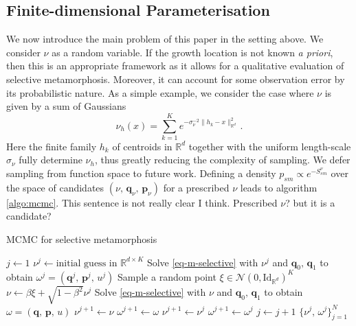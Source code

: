 \documentclass[runningheads]{llncs}
\newcommand{\Rd}{\mathbb{R}^{d}}
\newcommand{\RdK}{\mathbb{R}^{d\times K}}
\begin{document}
\subsection{Finite-dimensional Parameterisation}\label{subs:finite-dim-param}

We now introduce the main problem of this paper in the setting above. We
consider $\nu$ as a random variable. If the growth location is not known \emph{a
priori}, then this is an appropriate framework as it allows for a qualitative
evaluation of selective metamorphosis. Moreover, it can account for some
observation error by its probabilistic nature. As a simple example, we consider
the case where $\nu$ is given by a sum of Gaussians 
\begin{equation}\label{nu_h}
    \nu_h (x) = \sum_{k=1}^K e^{ -\sigma_\nu^{-2}\|h_k - x\|_{\Rd}^2}\, . 
\end{equation}
Here the finite family $h_k$ of centroids in $\Rd$ together with the uniform
length-scale $\sigma_\nu$ fully determine $\nu_h$, thus greatly reducing the
complexity of sampling. We defer sampling from function space to future work.
Defining a density $p_{sm} \propto e^{- S_{sm}^\nu}$ over the space of
candidates $(\nu,\,\mathbf q_\nu,\,\mathbf p_\nu)$ for a prescribed
$\nu$ leads to algorithm \ref{algo:mcmc}.
{\color{red} This sentence is not really clear I think. Prescribed $\nu$? but it is a candidate?}

\begin{algorithm}[h!]
\begin{algorithmic}
\caption{MCMC for selective metamorphosis}\label{algo:mcmc}
\Procedure{mcmcSM}{$N$, $K$, $\mathbf q_0$, $\mathbf q_1$, $\beta\in (0,1]$}
\State $j \gets 1$
\State $\nu^j \gets \text{initial guess in } \RdK$
\State Solve \eqref{eq-m-selective} with $\nu^j$ and $\mathbf q_0,\,\mathbf q_1$
to obtain $\omega^j = (\mathbf q^j,\,\mathbf p^j,\, u^j)$
\State Sample a random point $\xi \in \mathcal N(0, \text{Id}_{\mathbb R^d})^K$
\State $\nu \gets \beta \xi + \sqrt{1-\beta^2} \nu^j$
\State Solve \eqref{eq-m-selective} with $\nu$ and $\mathbf q_0,\,\mathbf q_1$
to obtain $\omega = (\mathbf q,\, \mathbf p,\, u)$
    \State $\nu^{j+1} \gets \nu$
    \State $\omega^{j+1} \gets \omega$
\Else
    \State $\nu^{j+1} \gets \nu^j$
    \State $\omega^{j+1} \gets \omega^j$
\EndIf
\State $j\gets j+1$
\EndWhile
\Return $\{\nu^j,\, \omega^j\}_{j=1}^N$
\EndProcedure
\end{algorithmic}
\end{algorithm}
\end{document}
